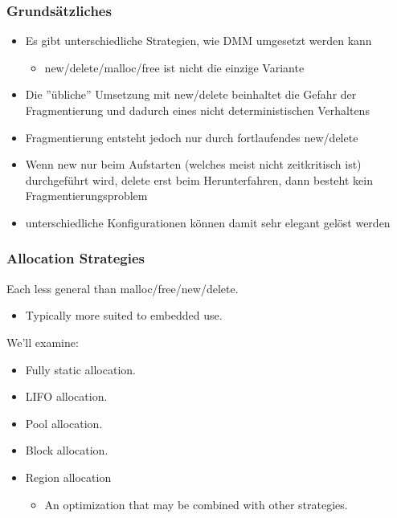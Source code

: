 \subsubsection{Grundsätzliches}
\begin{itemize}
  \item Es gibt unterschiedliche Strategien, wie DMM umgesetzt werden kann
  \begin{itemize}
    \item new/delete/malloc/free ist nicht die einzige Variante
  \end{itemize}
  \item Die ''übliche'' Umsetzung mit new/delete beinhaltet die Gefahr der Fragmentierung und dadurch eines nicht deterministischen Verhaltens
  \item Fragmentierung entsteht jedoch nur durch fortlaufendes new/delete
  \item Wenn new nur beim Aufstarten (welches meist nicht zeitkritisch ist) durchgeführt wird, delete erst beim Herunterfahren, dann besteht kein Fragmentierungsproblem
  \item unterschiedliche Konfigurationen können damit sehr elegant gelöst werden
\end{itemize}

\subsubsection{Allocation Strategies}
Each less general than malloc/free/new/delete.
\begin{itemize}
  \item Typically more suited to embedded use.
\end{itemize}
We'll examine:
\begin{itemize}
  \item Fully static allocation.
  \item LIFO allocation.
  \item Pool allocation.
  \item Block allocation.
  \item Region allocation
  \begin{itemize}
    \item An optimization that may be combined with other strategies.
  \end{itemize}
\end{itemize}

